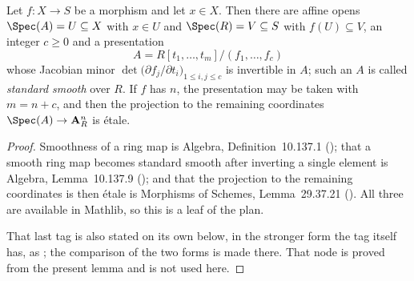 \begin{lemma}
\label{lem:pc-standard-smooth-form}
Let $f:X\to S$ be a  morphism and let $x\in X$.
Then there are affine opens $\Spec(A)=U\subseteq X$ with $x\in U$ and $\Spec(R)=V\subseteq S$
with $f(U)\subseteq V$, an integer $c\ge0$ and a presentation
\[
A=R[t_1,\dots,t_m]/(f_1,\dots,f_c)
\]
whose Jacobian minor $\det\bigl(\partial f_j/\partial t_i\bigr)_{1\le i,j\le c}$ is invertible
in $A$; such an $A$ is called \emph{standard smooth} over $R$.  If $f$ has
 $n$, the presentation may be taken
with $m=n+c$, and then the projection to the remaining
coordinates $\Spec(A)\to\mathbf A^n_R$ is \'etale.
\mathlibok\ 
\end{lemma}
\begin{proof}
Smoothness of a ring map is Algebra, Definition~10.137.1
(); that a smooth ring map becomes standard smooth
after inverting a single element is Algebra, Lemma~10.137.9
(); and that the projection to the remaining
coordinates is then \'etale is Morphisms of Schemes, Lemma~29.37.21
().  All three are available in Mathlib, so this is
a leaf of the plan.

That last tag is also stated on its own below, in the stronger form the
tag itself has, as ; the
comparison of the two forms is made there.  That node is proved from the
present lemma and is not used here.
\end{proof}

